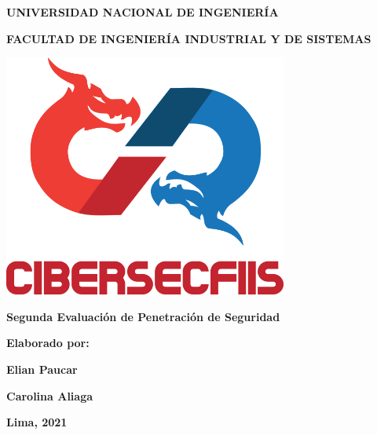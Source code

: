 \begin{titlepage}
    \centering
        {\large \textbf{UNIVERSIDAD NACIONAL DE INGENIERÍA}} \par \vspace{0.3cm}
        {\large \textbf{FACULTAD DE INGENIERÍA INDUSTRIAL Y DE SISTEMAS}} \par \vspace{1.125cm}
        \includegraphics[width=0.7\textwidth]{imagenes/CiberSecFIIS.png} \par \vspace{1.125cm}
        {\LARGE \textbf{Segunda Evaluación de Penetración de Seguridad}}\par \vspace{1cm}
        {\Large \textbf{Elaborado por:}} \par \vspace{1cm}
        \vfill
        {\large \textbf{Elian Paucar}} \par \vspace{0.8cm}
        {\large \textbf{Carolina Aliaga}} \par \vspace{3.55cm}
        \vfill
        {\textbf{Lima, 2021}}
\end{titlepage}
